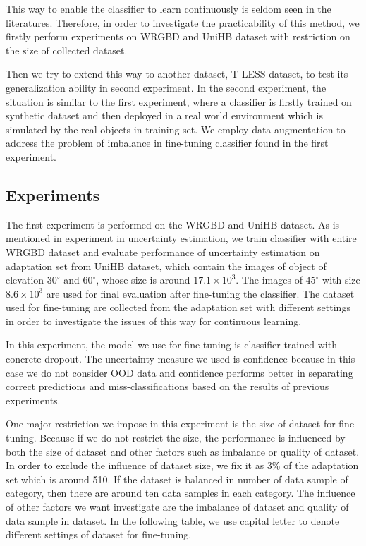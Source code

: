 This way to enable the classifier to learn continuously is seldom seen in the literatures. Therefore, in order to investigate the practicability of this method, we firstly perform experiments on WRGBD and UniHB dataset with restriction on the size of collected dataset. 

Then we try to extend this way to another dataset, T-LESS dataset, to test its generalization ability in second experiment. In the second experiment, the situation is similar to the first experiment, where a classifier is firstly trained on synthetic dataset and then deployed in a real world environment which is simulated by the real objects in training set.  We employ data augmentation to address the problem of imbalance in fine-tuning classifier found in the first experiment.
 
\subsection{Experiments }
The first experiment is performed on the WRGBD and UniHB dataset. As is mentioned in experiment  in uncertainty estimation, we train classifier with entire WRGBD dataset and evaluate performance of uncertainty estimation on adaptation set from UniHB dataset, which contain the images of object of elevation $30^{\circ}$ and $60^{\circ}$, whose size is around $17.1\times10^3$. The images of $45^{\circ}$ with size $8.6\times10^3$ are used for final evaluation after fine-tuning the classifier. The dataset used for fine-tuning are collected from the adaptation set with different settings in order to investigate the issues of this way for continuous learning. 

In this experiment, the model we use for fine-tuning is classifier trained with concrete dropout. The uncertainty measure we used is confidence because in this case we do not consider OOD data and confidence performs better in separating correct predictions and miss-classifications based on the results of previous experiments.

One major restriction we impose in this experiment is the size of dataset for fine-tuning. Because if we do not restrict the size, the performance is influenced by both the size of dataset and other factors such as imbalance or quality of dataset. In order to exclude the influence of dataset size, we fix it as 3\% of the adaptation set which is around 510. If the dataset is balanced in number of data sample of category, then there are around ten data samples in each category. The influence of other factors we want investigate are the imbalance of dataset and quality of data sample in dataset. In the following table, we use capital letter to denote different settings of dataset for fine-tuning.

